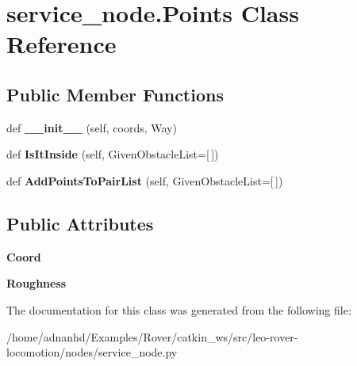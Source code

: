 \hypertarget{classservice__node_1_1Points}{}\section{service\+\_\+node.\+Points Class Reference}
\label{classservice__node_1_1Points}
\subsection*{Public Member Functions}
\begin{DoxyCompactItemize}
\item 
\mbox{\label{classservice__node_1_1Points_a4b61c9c2f75645cdb97d02a47485848f}} 
def {\bfseries \+\_\+\+\_\+init\+\_\+\+\_\+} (self, coords, Way)
\item 
\mbox{\label{classservice__node_1_1Points_af36e30c73ec133c560d11ae983338dbe}} 
def {\bfseries Is\+It\+Inside} (self, Given\+Obstacle\+List=\mbox{[}$\,$\mbox{]})
\item 
\mbox{\label{classservice__node_1_1Points_a8522e492d24585f354b324b0af5281c5}} 
def {\bfseries Add\+Points\+To\+Pair\+List} (self, Given\+Obstacle\+List=\mbox{[}$\,$\mbox{]})
\end{DoxyCompactItemize}
\subsection*{Public Attributes}
\begin{DoxyCompactItemize}
\item 
\mbox{\label{classservice__node_1_1Points_a5ad9393800d33cfdb3b1be4b94818a9d}} 
{\bfseries Coord}
\item 
\mbox{\label{classservice__node_1_1Points_a9b66d38fcaa6f50c86c72aa290cb731b}} 
{\bfseries Roughness}
\end{DoxyCompactItemize}


The documentation for this class was generated from the following file\+:\begin{DoxyCompactItemize}
\item 
/home/adnanhd/\+Examples/\+Rover/catkin\+\_\+ws/src/leo-\/rover-\/locomotion/nodes/service\+\_\+node.\+py\end{DoxyCompactItemize}
